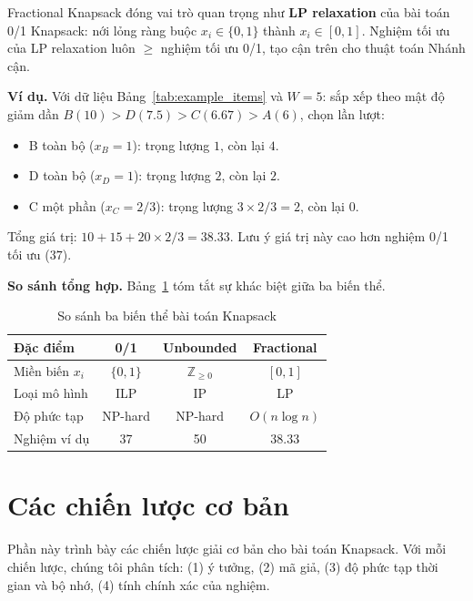Fractional Knapsack đóng vai trò quan trọng như \textbf{LP relaxation} của bài toán 0/1 Knapsack: nới lỏng ràng buộc $x_i \in \{0,1\}$ thành $x_i \in [0,1]$. Nghiệm tối ưu của LP relaxation luôn $\geq$ nghiệm tối ưu 0/1, tạo cận trên cho thuật toán Nhánh cận.

\textbf{Ví dụ.} Với dữ liệu Bảng~\ref{tab:example_items} và $W=5$: sắp xếp theo mật độ giảm dần $B(10) > D(7.5) > C(6.67) > A(6)$, chọn lần lượt:
\begin{itemize}[noitemsep]
    \item B toàn bộ ($x_B=1$): trọng lượng $1$, còn lại $4$.
    \item D toàn bộ ($x_D=1$): trọng lượng $2$, còn lại $2$.
    \item C một phần ($x_C=2/3$): trọng lượng $3 \times 2/3 = 2$, còn lại $0$.
\end{itemize}
Tổng giá trị: $10 + 15 + 20 \times 2/3 = 38.33$. Lưu ý giá trị này cao hơn nghiệm 0/1 tối ưu ($37$).

\textbf{So sánh tổng hợp.} Bảng~\ref{tab:compare_variants} tóm tắt sự khác biệt giữa ba biến thể.

\begin{table}[H]
\centering
\begin{tabular}{l|ccc}
\toprule
\textbf{Đặc điểm} & \textbf{0/1} & \textbf{Unbounded} & \textbf{Fractional} \\
\midrule
Miền biến $x_i$ & $\{0, 1\}$ & $\mathbb{Z}_{\geq 0}$ & $[0, 1]$ \\
Loại mô hình & ILP & IP & LP \\
Độ phức tạp & NP-hard & NP-hard & $O(n \log n)$ \\
Nghiệm ví dụ & 37 & 50 & 38.33 \\
\bottomrule
\end{tabular}
\caption{So sánh ba biến thể bài toán Knapsack}
\label{tab:compare_variants}
\end{table}


\section{Các chiến lược cơ bản}
\label{sec:basic_strategies}

Phần này trình bày các chiến lược giải cơ bản cho bài toán Knapsack. Với mỗi chiến lược, chúng tôi phân tích: (1) ý tưởng, (2) mã giả, (3) độ phức tạp thời gian và bộ nhớ, (4) tính chính xác của nghiệm.

